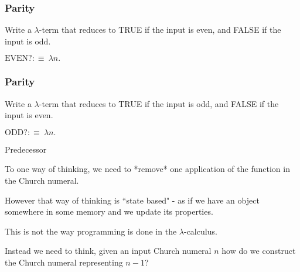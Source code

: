 \documentclass{beamer}
\begin{document}
\begin{frame}
	\frametitle{Parity}

	Write a $\lambda$-term that reduces to TRUE if the input is even, and FALSE if the input is odd. 

	$\text{EVEN?} :\equiv \ \lambda n. \ $

	\vspace{4cm}

\end{frame}

\begin{frame}
	\frametitle{Parity}

	Write a $\lambda$-term that reduces to TRUE if the input is odd, and FALSE if the input is even. 

	$\text{ODD?} :\equiv \ \lambda n. \ $

	\vspace{4cm}

\end{frame}

\begin{frame}{Predecessor}

  
  To one way of thinking, we need to *remove* one application of the function in the Church numeral. 
  
  \vspace{1.5cm}
  
  However that way of thinking is ``state based" - as if we have an object somewhere in some memory and we update its properties. 
  
  \vspace{0.5cm}
  
  This is not the way programming is done in the $\lambda$-calculus. 
  
  \vspace{0.5cm}
  
  Instead we need to think, given an input Church numeral $n$ how do we construct the Church numeral representing $n-1$?
  
  \vspace{1cm}
  
\end{frame}
\end{document}
